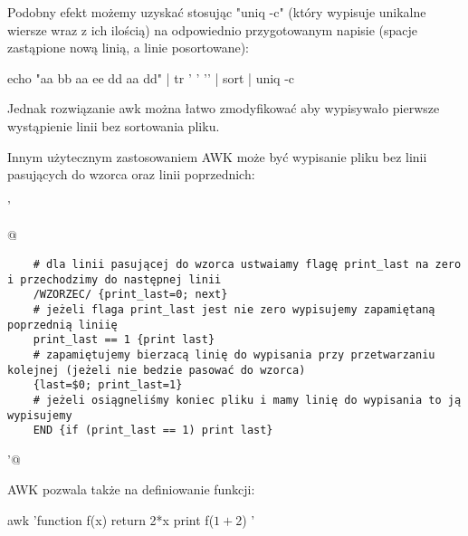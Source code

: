 Podobny efekt możemy uzyskać stosując "uniq -c" (który wypisuje unikalne wiersze wraz z ich ilością)
na odpowiednio przygotowanym napisie (spacje zastąpione nową linią, a linie posortowane):

\begin{CodeFrame*}[bash]{}
echo "aa bb aa ee dd aa dd" | tr ' ' '\n' | sort | uniq -c
\end{CodeFrame*}
Jednak rozwiązanie awk można łatwo zmodyfikować aby wypisywało pierwsze wystąpienie linii bez sortowania pliku.

Innym użytecznym zastosowaniem AWK może być wypisanie pliku bez linii pasujących do wzorca oraz linii poprzednich:

\begin{oframed}\noindent{}\Verb@ '{@\vspace{-0.95em}
\begin{verbatim}
	# dla linii pasującej do wzorca ustwaiamy flagę print_last na zero i przechodzimy do następnej linii
	/WZORZEC/ {print_last=0; next}
	# jeżeli flaga print_last jest nie zero wypisujemy zapamiętaną poprzednią liniię
	print_last == 1 {print last}
	# zapamiętujemy bierzacą linię do wypisania przy przetwarzaniu kolejnej (jeżeli nie bedzie pasować do wzorca)
	{last=$0; print_last=1}
	# jeżeli osiągneliśmy koniec pliku i mamy linię do wypisania to ją wypisujemy
	END {if (print_last == 1) print last}
\end{verbatim}
\vspace{-0.95em}\Verb@}'@\end{oframed}

AWK pozwala także na definiowanie funkcji:
\begin{CodeFrame*}[bash]{}
awk 'function f(x) {return 2*x} { print f($1+$2) }'
\end{CodeFrame*}
